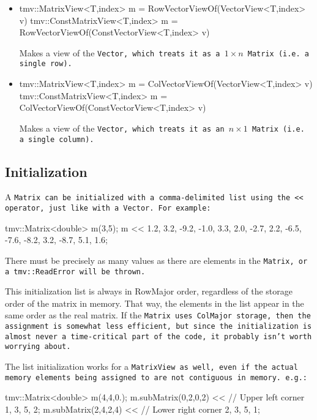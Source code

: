 \begin{itemize}
\item
\begin{tmvcode}
tmv::MatrixView<T,index> m = 
      RowVectorViewOf(VectorView<T,index> v)
tmv::ConstMatrixView<T,index> m = 
      RowVectorViewOf(ConstVectorView<T,index> v)
\end{tmvcode}
Makes a view of the \tt{Vector}, which treats it as a $1\times n$ \tt{Matrix}
(i.e. a single row).  

\item
\begin{tmvcode}
tmv::MatrixView<T,index> m = 
      ColVectorViewOf(VectorView<T,index> v)
tmv::ConstMatrixView<T,index> m = 
      ColVectorViewOf(ConstVectorView<T,index> v)
\end{tmvcode}
Makes a view of the \tt{Vector}, which treats it as an $n \times 1$ \tt{Matrix}
(i.e. a single column).  

\end{itemize}

\subsection{Initialization}
\label{Matrix_Initialization}

A \tt{Matrix} can be initialized with a comma-delimited list using
the \tt{<<} operator, just like with a \tt{Vector}.  For example:
\begin{tmvcode}
tmv::Matrix<double> m(3,5);
m << 1.2,  3.2, -9.2, -1.0,  3.3, 
     2.0, -2.7,  2.2, -6.5, -7.6, 
    -8.2,  3.2, -8.7,  5.1,  1.6;
\end{tmvcode}
There must be precisely as many values as there are elements in the \tt{Matrix},
or a \tt{tmv::ReadError} will be thrown.

This initialization list is always in RowMajor order, regardless of the storage order of the 
matrix in memory.  That way, the elements in the list appear in the same order as the 
real matrix.  If the \tt{Matrix} uses \tt{ColMajor} storage, then the assignment is somewhat
less efficient, but since the initialization is almost never a time-critical part of the code, 
it probably isn't worth worrying about.

The list initialization works for a \tt{MatrixView} as well, even if the actual memory elements
being assigned to are not contiguous in memory.  e.g.:
\begin{tmvcode}
tmv::Matrix<double> m(4,4,0.);
m.subMatrix(0,2,0,2) << // Upper left corner
    1,  3, 
    5,  2;
m.subMatrix(2,4,2,4) << // Lower right corner
    2,  3, 
    5,  1;
\end{tmvcode}

